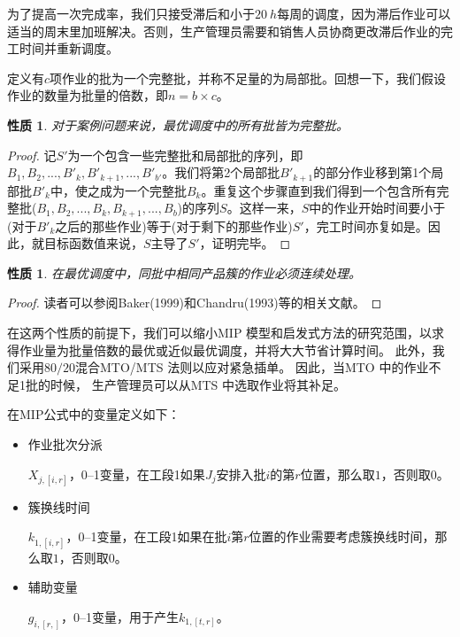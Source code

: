 为了提高一次完成率，我们只接受滞后和小于$20\ h$每周的调度，因为滞后作业可以适当的周末里加班解决。否则，生产管理员需要和销售人员协商更改滞后作业的完工时间并重新调度。
\theoremheaderfont{\heiti}
\newtheorem{propetry}[prop]{性质}
\newtheorem{example}[exam]{例}

定义有$c$项作业的批为一个完整批，并称不足量的为局部批。回想一下，我们假设作业的数量为批量的倍数，即$n=b\times c$。

\begin{propetry}
对于案例问题来说，最优调度中的所有批皆为完整批。
\end{propetry}
\begin{proof}
记$S'$为一个包含一些完整批和局部批的序列，即$B_1,B_2,...,B'_k,B'_{k+1},...,B'_{b'}$。我们将第2个局部批$B'_{k+1}$的部分作业移到第1个局部批$B'_k$中，使之成为一个完整批$B_k$。重复这个步骤直到我们得到一个包含所有完整批($B_1,B_2,...,B_k,B_{k+1},...,B_b$)的序列$S$。这样一来，$S$中的作业开始时间要小于(对于$B'_k$之后的那些作业)等于(对于剩下的那些作业)$S'$，完工时间亦复如是。因此，就目标函数值来说，$S\text{主导了}S'$，证明完毕。
\end{proof}
\begin{propetry}
在最优调度中，同批中相同产品簇的作业必须连续处理。
\end{propetry}
\begin{proof}
读者可以参阅Baker(1999)和Chandru(1993)等的相关文献。
\end{proof}

在这两个性质的前提下，我们可以缩小MIP 模型和启发式方法的研究范围，以求得作业量为批量倍数的最优或近似最优调度，并将大大节省计算时间。
此外，我们采用$80/20$混合MTO/MTS 法则以应对紧急插单。
因此，当MTO 中的作业不足1批的时候，
生产管理员可以从MTS 中选取作业将其补足。

在MIP公式中的变量定义如下：
\begin{itemize}
\itemsep=0pt\parskip=0pt\parsep=0pt
\item 作业批次分派

$X_{j,[i,r]}$，0--1变量，在工段1如果$J_j$安排入批$i$的第$r$位置，那么取$1$，否则取$0$。
\item 簇换线时间

$k_{1,[i,r]}$，0--1变量，在工段1如果在批$i\text{第}r$位置的作业需要考虑簇换线时间，那么取$1\text{，否则取}0$。
\item 辅助变量

$g_{i,[r,]}$，0--1变量，用于产生$k_{1,[t,r]}$。
\end{itemize}

